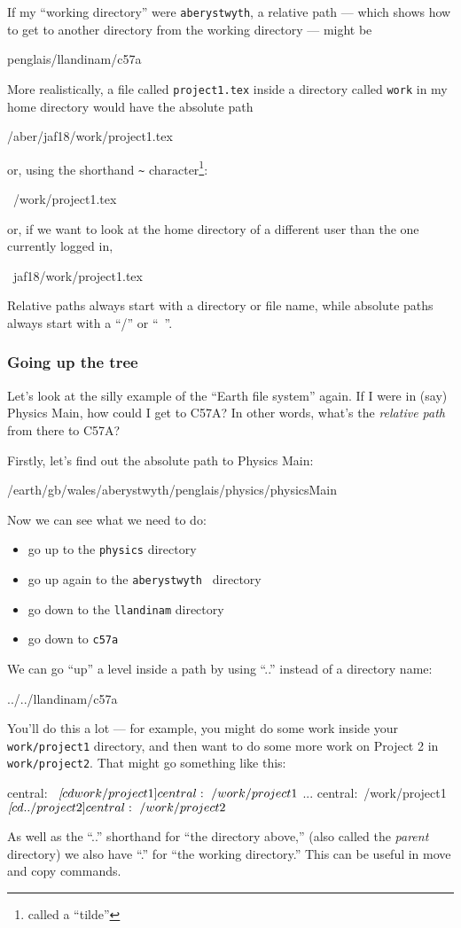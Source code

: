 \documentclass[twocolumn]{article}
\begin{document}
If my ``working directory'' were \verb+aberystwyth+, a relative path ---
which shows how to get to another directory from the working directory ---
might be
\begin{v}
penglais/llandinam/c57a
\end{v}
More realistically, a file called \verb+project1.tex+ inside a directory
called \verb+work+ in my home directory would have the absolute path
\begin{v}
/aber/jaf18/work/project1.tex
\end{v}
or, using the shorthand \verb+~+ character\footnote{called a ``tilde''}:
\begin{v}
~/work/project1.tex
\end{v}
or, if we want to look at the home directory of a different user than the
one currently logged in,
\begin{v}
~jaf18/work/project1.tex
\end{v}
Relative paths always start with a directory or file name, while
absolute paths always start with a ``/'' or ``~''.

\subsubsection{Going up the tree}
Let's look at the silly example of the ``Earth file system'' again. If
I were in (say) Physics Main, how could I get to C57A? In other
words, what's the \emph{relative path} from there to C57A?

Firstly, let's find out the absolute path to Physics Main:
\begin{v}
/earth/gb/wales/aberystwyth/penglais/physics/physicsMain
\end{v}
Now we can see what we need to do:
\begin{itemize}
\item go up to the \verb+physics+ directory
\item go up again to the \verb+aberystwyth + directory
\item go down to the \verb+llandinam+ directory
\item go down to \verb+c57a+
\end{itemize}
We can go ``up'' a level inside a path by using ``..'' instead of a directory
name:
\begin{v}
../../llandinam/c57a
\end{v}
You'll do this a lot --- for example, you might do some work inside your
\verb+work/project1+ directory, and then want to do some more work on
Project 2 in \verb+work/project2+. That might go something like this:
\begin{v}[commandchars=\\\[\]]
central:~ $ \emph[cd work/project1]
central:~/work/project1 $
...
central:~/work/project1 $ \emph[cd ../project2]
central:~/work/project2 $ 
\end{v}
As well as the ``..'' shorthand for ``the directory above,'' (also called
the \emph{parent} directory) we also
have ``.'' for ``the working directory.'' This can be useful in move 
and copy commands. 
\end{document}
